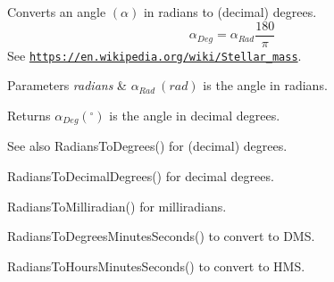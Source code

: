 Converts an angle $(\alpha)$ in radians to (decimal) degrees. \[\alpha_{Deg}=\alpha_{Rad}\frac{180}{\pi}\] See \href{https://en.wikipedia.org/wiki/Stellar_mass}{\tt https\+://en.\+wikipedia.\+org/wiki/\+Stellar\+\_\+mass}. 


\begin{DoxyParams}{Parameters}
{\em radians} & $\alpha_{Rad}\ (rad)$ is the angle in radians. \\
\hline
\end{DoxyParams}
\begin{DoxyReturn}{Returns}
$\alpha_{Deg} ({^{\circ}})$ is the angle in decimal degrees. 
\end{DoxyReturn}
\begin{DoxySeeAlso}{See also}
Radians\+To\+Degrees() for (decimal) degrees. 

Radians\+To\+Decimal\+Degrees() for decimal degrees. 

Radians\+To\+Milliradian() for milliradians. 

Radians\+To\+Degrees\+Minutes\+Seconds() to convert to D\+MS. 

Radians\+To\+Hours\+Minutes\+Seconds() to convert to H\+MS. 
\end{DoxySeeAlso}
